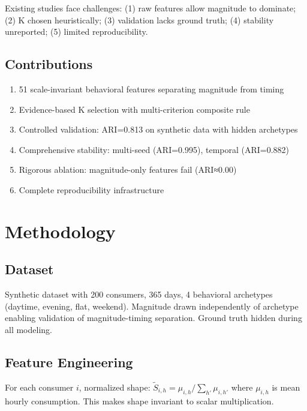\documentclass[11pt,a4paper]{article}
\begin{document}
Existing studies face challenges: (1) raw features allow magnitude to dominate; (2) K chosen heuristically; (3) validation lacks ground truth; (4) stability unreported; (5) limited reproducibility.

\subsection{Contributions}

\begin{enumerate}
\item 51 scale-invariant behavioral features separating magnitude from timing
\item Evidence-based K selection with multi-criterion composite rule
\item Controlled validation: ARI=0.813 on synthetic data with hidden archetypes
\item Comprehensive stability: multi-seed (ARI=0.995), temporal (ARI=0.882)
\item Rigorous ablation: magnitude-only features fail (ARI≈0.00)
\item Complete reproducibility infrastructure
\end{enumerate}

\section{Methodology}

\subsection{Dataset}

Synthetic dataset with 200 consumers, 365 days, 4 behavioral archetypes (daytime, evening, flat, weekend). Magnitude drawn independently of archetype enabling validation of magnitude-timing separation. Ground truth hidden during all modeling.

\subsection{Feature Engineering}

For each consumer $i$, normalized shape: $\tilde{S}_{i,h} = \mu_{i,h} / \sum_{h'} \mu_{i,h'}$ where $\mu_{i,h}$ is mean hourly consumption. This makes shape invariant to scalar multiplication.
\end{document}
